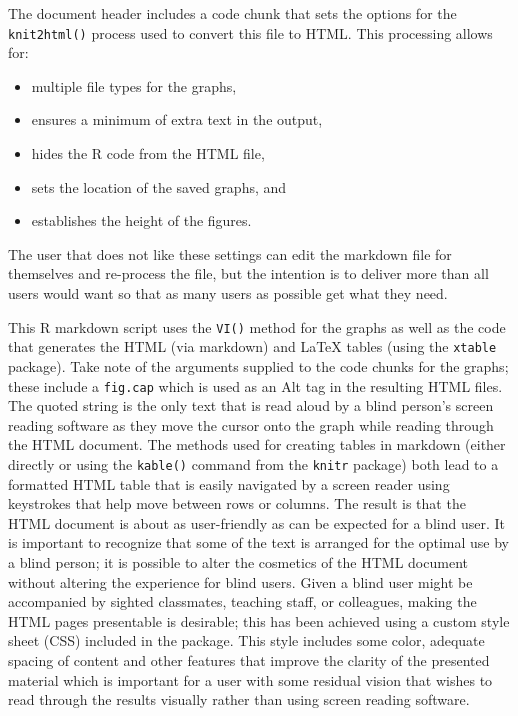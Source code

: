 \documentclass[
]{book}
\providecommand{\tightlist}{%
  \setlength{\itemsep}{0pt}\setlength{\parskip}{0pt}}
\begin{document}
The document header includes a code chunk that sets the options for the \texttt{knit2html()} process used to convert this file to HTML.
This processing allows for:

\begin{itemize}
\tightlist
\item
  multiple file types for the graphs,
\item
  ensures a minimum of extra text in the output,
\item
  hides the R code from the HTML file,
\item
  sets the location of the saved graphs, and
\item
  establishes the height of the figures.
\end{itemize}

The user that does not like these settings can edit the markdown file for themselves and re-process the file, but the intention is to deliver more than all users would want so that as many users as possible get what they need.

This R markdown script uses the \texttt{VI()} method for the graphs as well as the code that generates the HTML (via markdown) and LaTeX tables (using the \texttt{xtable} package). Take note of the arguments supplied to the code chunks for the graphs; these include a \texttt{fig.cap} which is used as an Alt tag in the resulting HTML files. The quoted string is the only text that is read aloud by a blind person's screen reading software as they move the cursor onto the graph while reading through the HTML document. The methods used for creating tables in markdown (either directly or using the \texttt{kable()} command from the \texttt{knitr} package) \citep{Rpkg-knitr} both lead to a formatted HTML table that is easily navigated by a screen reader using keystrokes that help move between rows or columns. The result is that the HTML document is about as user-friendly as can be expected for a blind user. It is important to recognize that some of the text is arranged for the optimal use by a blind person; it is possible to alter the cosmetics of the HTML document without altering the experience for blind users. Given a blind user might be accompanied by sighted classmates, teaching staff, or colleagues, making the HTML pages presentable is desirable; this has been achieved using a custom style sheet (CSS) included in the package. This style includes some color, adequate spacing of content and other features that improve the clarity of the presented material which is important for a user with some residual vision that wishes to read through the results visually rather than using screen reading software.
\end{document}
